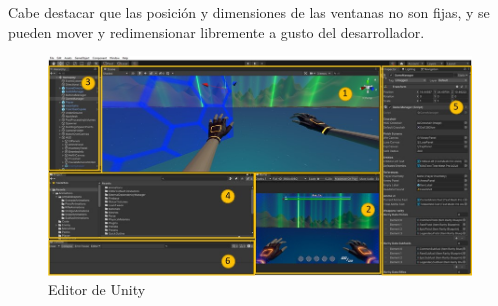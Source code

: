Cabe destacar que las posición y dimensiones de las ventanas no son fijas, y se pueden mover y redimensionar libremente a gusto del desarrollador. 

\begin{figure}[h]
    \centering
    \includegraphics[scale=0.45]{img/UnityEditor.jpg}
    \caption{Editor de Unity}
    \label{fig:EditorUnity}
    \end{figure}
    
